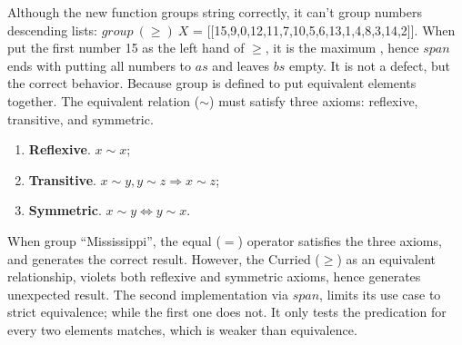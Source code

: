\documentclass[b5paper]{article}
\begin{document}
Although the new function groups string correctly, it can't group numbers descending lists: $\textit{group}\ (\geq)\ X$ = [[15,9,0,12,11,7,10,5,6,13,1,4,8,3,14,2]]. When put the first number 15 as the left hand of $\geq$, it is the maximum , hence $span$ ends with putting all numbers to $as$ and leaves $bs$ empty. It is not a defect, but the correct behavior. Because group is defined to put equivalent elements together. The equivalent relation ($\sim$) must satisfy three axioms: reflexive, transitive, and symmetric.

\begin{enumerate}
\item \textbf{Reflexive}. $x \sim x$;
\item \textbf{Transitive}. $x \sim y, y \sim z \Rightarrow x \sim z$;
\item \textbf{Symmetric}. $x \sim y \Leftrightarrow y \sim x$.
\end{enumerate}

When group ``Mississippi'', the equal ($=$) operator satisfies the three axioms, and generates the correct result. However, the Curried ($\geq$) as an equivalent relationship, violets both reflexive and symmetric axioms, hence generates unexpected result. The second implementation via $span$, limits its use case to strict equivalence; while the first one does not. It only tests the predication for every two elements matches, which is weaker than equivalence.

\begin{Exercise}\label{ex:list-take-drop}
\end{Exercise}
\end{document}
